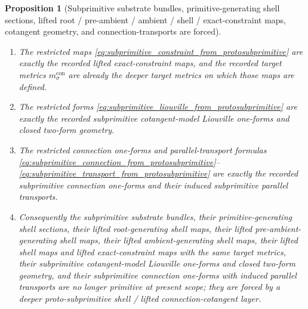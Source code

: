 \documentclass[11pt]{article}
\newcommand{\ConstraintMetric}[1]{m_{#1}^{\mathrm{con}}}
\newtheorem{proposition}{Proposition}
\begin{document}
\begin{proposition}[Subprimitive substrate bundles, primitive-generating shell sections, lifted root / pre-ambient / ambient / shell / exact-constraint maps, cotangent geometry, and connection-transports are forced]
\begin{enumerate}
    \item The restricted maps \eqref{eq:subprimitive_constraint_from_protosubprimitive} are exactly the recorded lifted exact-constraint maps, and the recorded target metrics \(\ConstraintMetric{\sigma}\) are already the deeper target metrics on which those maps are defined.
    \item The restricted forms \eqref{eq:subprimitive_liouville_from_protosubprimitive} are exactly the recorded subprimitive cotangent-model Liouville one-forms and closed two-form geometry.
    \item The restricted connection one-forms and parallel-transport formulas \eqref{eq:subprimitive_connection_from_protosubprimitive}--\eqref{eq:subprimitive_transport_from_protosubprimitive} are exactly the recorded subprimitive connection one-forms and their induced subprimitive parallel transports.
    \item Consequently the subprimitive substrate bundles, their primitive-generating shell sections, their lifted root-generating shell maps, their lifted pre-ambient-generating shell maps, their lifted ambient-generating shell maps, their lifted shell maps and lifted exact-constraint maps with the same target metrics, their subprimitive cotangent-model Liouville one-forms and closed two-form geometry, and their subprimitive connection one-forms with induced parallel transports are no longer primitive at present scope; they are forced by a deeper proto-subprimitive shell / lifted connection-cotangent layer.
\end{enumerate}
\end{proposition}
\end{document}
